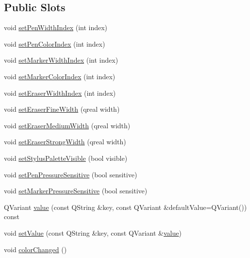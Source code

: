 \subsection*{Public Slots}
\begin{DoxyCompactItemize}
\item 
void \hyperlink{class_u_b_settings_a0dd7f7a64140d369fe8a8caf93745b17}{set\-Pen\-Width\-Index} (int index)
\item 
void \hyperlink{class_u_b_settings_acc0c7274abb6e7ea12f6912209793f4d}{set\-Pen\-Color\-Index} (int index)
\item 
void \hyperlink{class_u_b_settings_a132385806972236ee97da470806e924d}{set\-Marker\-Width\-Index} (int index)
\item 
void \hyperlink{class_u_b_settings_a9016ec901a0d81130998a09a6afdc335}{set\-Marker\-Color\-Index} (int index)
\item 
void \hyperlink{class_u_b_settings_ab7b4875998f2a4465892619851feb31e}{set\-Eraser\-Width\-Index} (int index)
\item 
void \hyperlink{class_u_b_settings_aa68e161b0666a8be65baa49a9a3f2649}{set\-Eraser\-Fine\-Width} (qreal width)
\item 
void \hyperlink{class_u_b_settings_a6b94d6e67d427672bf93f1d3076e2ec4}{set\-Eraser\-Medium\-Width} (qreal width)
\item 
void \hyperlink{class_u_b_settings_a1c18b6db9f9ce9cc96e58c24ec6659bb}{set\-Eraser\-Strong\-Width} (qreal width)
\item 
void \hyperlink{class_u_b_settings_a6dd4c80318e96e1681b7f0e62d2e2407}{set\-Stylus\-Palette\-Visible} (bool visible)
\item 
void \hyperlink{class_u_b_settings_a2586d5ebe0986835ce9cc92ae81a5291}{set\-Pen\-Pressure\-Sensitive} (bool sensitive)
\item 
void \hyperlink{class_u_b_settings_a40b385dbb1951ddc3ed190faa73deded}{set\-Marker\-Pressure\-Sensitive} (bool sensitive)
\item 
Q\-Variant \hyperlink{class_u_b_settings_a30f5b15068954099f41c054979593275}{value} (const Q\-String \&key, const Q\-Variant \&default\-Value=Q\-Variant()) const 
\item 
void \hyperlink{class_u_b_settings_acf2a7dc86ac6849cdae8ad611ba71878}{set\-Value} (const Q\-String \&key, const Q\-Variant \&\hyperlink{class_u_b_settings_a30f5b15068954099f41c054979593275}{value})
\item 
void \hyperlink{class_u_b_settings_a2b1e6e2f5e03999de41ee2cdf99cdd0a}{color\-Changed} ()
\end{DoxyCompactItemize}
